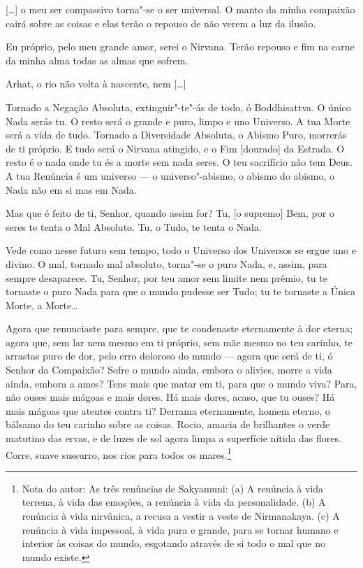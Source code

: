 [\ldots{}] o meu ser compassivo torna"-se o ser universal. O manto da minha
compaixão cairá sobre as coisas e elas terão o repouso de não verem a
luz da ilusão.

Eu próprio, pelo meu grande amor, serei o Nirvana. Terão repouso e fim
na carne da minha alma todas as almas que sofrem.

 Arhat, o rio não volta à nascente, nem [\ldots{}]

 Tornado a Negação Absoluta, extinguir"-te"-ás de todo, ó
Boddhisattva. O único Nada serás tu. O resto será o grande e puro,
limpo e uno Universo. A tua Morte será a vida de tudo. Tornado a
Diversidade Absoluta, o Abismo Puro, morrerás de ti próprio. E tudo
será o Nirvana atingido, e o Fim [dourado] da Estrada. O resto é o
nada onde tu és a morte sem nada seres. O teu sacrifício não tem
Deus. A tua Renúncia é um universo --- o universo"-abismo, o abismo do
abismo, o Nada não em si mas em Nada.

 Mas que é feito de ti, Senhor, quando assim for? Tu, [o supremo]
Bem, por o seres te tenta o Mal Absoluto. Tu, o Tudo, te tenta o
Nada.

Vede como nesse futuro sem tempo, todo o Universo dos Universos se
ergue uno e divino. O mal, tornado mal absoluto, torna"-se o puro
Nada, e, assim, para sempre desaparece. Tu, Senhor, por teu amor sem
limite nem prêmio, tu te tornaste o puro Nada para que o mundo
pudesse ser Tudo; tu te tornaste a Única Morte, a Morte\ldots{}

 Agora que renunciaste para sempre, que te condenaste eternamente à
dor eterna; agora que, sem lar nem mesmo em ti próprio, sem mãe mesmo
no teu carinho, te arrastas puro de dor, pelo erro doloroso do mundo
--- agora que será de ti, ó Senhor da Compaixão? Sofre o mundo ainda,
embora o alivies, morre a vida ainda, embora a ames? Tens mais que
matar em ti, para que o mundo viva? Para, não ouses mais mágoas e
mais dores. Há mais dores, acaso, que tu ouses? Há mais mágoas que
atentes contra ti? Derrama eternamente, homem eterno, o bálsamo do
teu carinho sobre as coisas. Rocio, amacia de brilhantes o verde
matutino das ervas, e de luzes de sol agora limpa a superfície nítida
das flores. Corre, suave sussurro, nos rios para todos os
mares.\footnote{ Nota do autor: As três renúncias de
Sakyamuni: (a)
A renúncia à vida terrena, à vida das emoções, a renúncia à vida
da personalidade.
(b) A renúncia à vida nirvânica, a recusa a vestir a veste de
Nirmanakaya.
(c) A renúncia à vida impessoal, à vida pura e grande, para se
tornar humano e interior às coisas do mundo, esgotando através de si
todo o mal que no mundo existe.}

